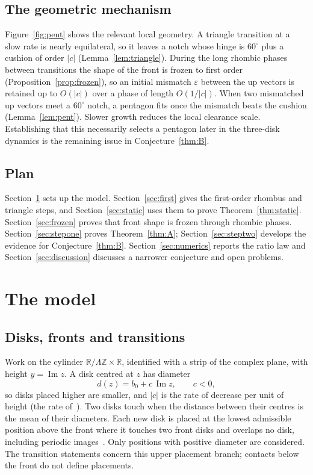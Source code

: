 \documentclass[11pt]{amsart}
\theoremstyle{definition}
\newcommand{\R}{\mathbb R}
\newcommand{\eps}{\varepsilon}
\DeclareMathOperator{\Imag}{Im}
\begin{document}
\subsection*{The geometric mechanism} Figure~\ref{fig:pent} shows the relevant local geometry. A triangle transition at a slow rate is nearly equilateral, so it leaves a notch whose hinge is
$60^\circ$ plus a cushion of order $|c|$ (Lemma~\ref{lem:triangle}). During the long rhombic phases
between transitions the shape of the front is frozen to first order (Proposition~\ref{prop:frozen}),
so an initial mismatch $\eps$ between the up vectors is retained up to $O(|c|)$ over a
phase of length $O(1/|c|)$. When two mismatched up vectors
meet a $60^\circ$ notch, a pentagon fits once the mismatch beats the cushion (Lemma~\ref{lem:pent}).
Slower growth reduces the local clearance scale. Establishing that this necessarily selects
a pentagon later in the three-disk dynamics is the remaining issue in Conjecture~\ref{thm:B}.

\subsection*{Plan} Section~\ref{sec:model} sets up the model. Section~\ref{sec:first} gives the first-order
rhombus and triangle steps, and Section~\ref{sec:static} uses them to prove Theorem~\ref{thm:static}.
Section~\ref{sec:frozen} proves that front shape is frozen through rhombic phases. Section~\ref{sec:stepone}
proves Theorem~\ref{thm:A}; Section~\ref{sec:steptwo} develops the evidence for
Conjecture~\ref{thm:B}. Section~\ref{sec:numerics}
reports the ratio law and Section~\ref{sec:discussion} discusses a narrower conjecture and open problems.

\section{The model}\label{sec:model}

\subsection{Disks, fronts and transitions}
Work on the cylinder $\R/\Lambda\mathbb Z\times\R$, identified with a strip of the complex plane, with
height $y=\Imag z$. A disk centred at $z$ has diameter
\begin{equation}\label{eq:diam}
d(z)=b_0+c\,\Imag z,\qquad c<0,
\end{equation}
so disks placed higher are smaller, and $|c|$ is the rate of decrease per unit of height (the rate
of~\cite{GDD}). Two disks touch when the distance between their centres is the mean of their
diameters. Each new disk is placed at the lowest admissible position above the front where it touches
two front disks and overlaps no disk, including periodic images~\cite{GDD,GD}. Only positions with
positive diameter are considered. The transition statements concern this upper placement branch;
contacts below the front do not define placements.
\end{document}
